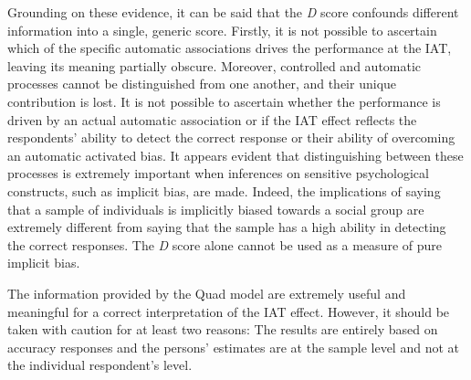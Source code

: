 \documentclass[12pt]{book}
\begin{document}
Grounding on these evidence, it can be said that the \emph{D} score confounds different information into a single, generic score. Firstly, it is not possible to ascertain which of the specific automatic associations drives the performance at the IAT, leaving its meaning partially obscure. 
Moreover, controlled and automatic processes cannot be distinguished from one another, and their unique contribution is lost. It is not possible to ascertain whether the performance is driven by an actual automatic association or if the IAT effect reflects the respondents' ability to detect the correct response or their ability of overcoming an automatic activated bias. 
It appears evident that distinguishing between these processes is extremely important when inferences on sensitive psychological constructs, such as implicit bias, are made. Indeed, the implications of saying that a sample of individuals is implicitly biased towards a social group are extremely different from saying that the sample has a high ability in detecting the correct responses.
The \emph{D} score alone cannot be used as a measure of pure implicit bias.

The information provided by the Quad model are extremely useful and meaningful for a correct interpretation of the IAT effect. 
However, it should be taken with caution for at least two reasons: The results are entirely based on accuracy responses and the persons' estimates are at the sample level and not at the individual respondent's level.
\end{document}
